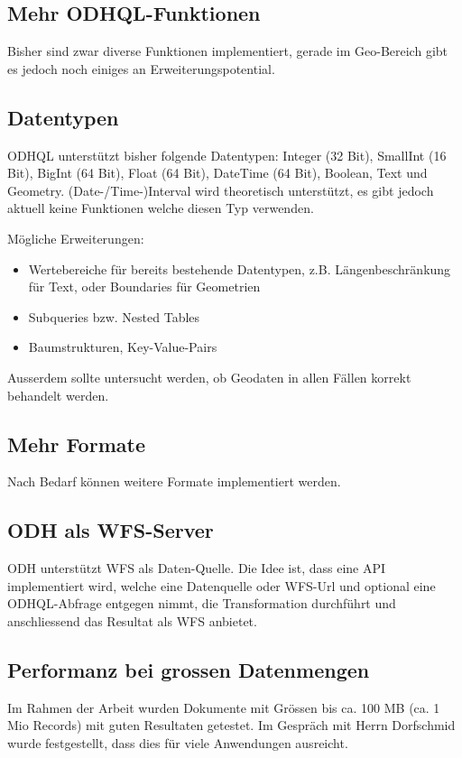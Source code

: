 \subsection{Mehr ODHQL-Funktionen}
Bisher sind zwar diverse Funktionen implementiert, gerade im Geo-Bereich gibt es jedoch noch einiges an Erweiterungspotential.

\subsection{Datentypen}
ODHQL unterstützt bisher folgende Datentypen: Integer (32 Bit), SmallInt (16 Bit), BigInt (64 Bit), Float (64 Bit), DateTime (64 Bit), Boolean, Text und Geometry. (Date-/Time-)Interval wird theoretisch unterstützt, es gibt jedoch aktuell keine Funktionen welche diesen Typ verwenden.

Mögliche Erweiterungen:
\begin{itemize}
\item Wertebereiche für bereits bestehende Datentypen, z.B. Längenbeschränkung für Text, oder Boundaries für Geometrien
\item Subqueries bzw. Nested Tables
\item Baumstrukturen, Key-Value-Pairs
\end{itemize}

Ausserdem sollte untersucht werden, ob Geodaten in allen Fällen korrekt behandelt werden.

\subsection{Mehr Formate}
Nach Bedarf können weitere Formate implementiert werden.

\subsection{ODH als WFS-Server}
ODH unterstützt WFS als Daten-Quelle. Die Idee ist, dass eine API implementiert wird, welche eine Datenquelle oder WFS-Url und optional eine ODHQL-Abfrage entgegen nimmt, die Transformation durchführt und anschliessend das Resultat als WFS anbietet.

\subsection{Performanz bei grossen Datenmengen}
Im Rahmen der Arbeit wurden Dokumente mit Grössen bis ca. 100 MB (ca. 1 Mio Records) mit guten Resultaten getestet. Im Gespräch mit Herrn Dorfschmid wurde festgestellt, dass dies für viele Anwendungen ausreicht.

